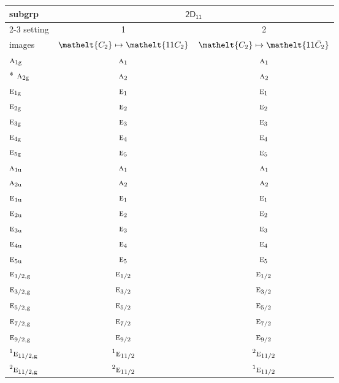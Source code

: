 \documentclass[10pt,a4paper]{article}
\numberwithin{equation}{section}
\newcommand{\eltfont}[1]{{\let\sigma\eltsigma\mathelt{#1}}}
\newcommand{\grp}[1]{\mathsf{#1}}
\newcommand{\irr}[1]{\text{\normalfont\scshape #1}}
\newcommand{\conjpair}[1]{{}^{#1}}
\newcommand{\cls}[1]{\eltfont{#1}}
\newcommand{\ptag}[1]{\mathrm{#1}}
\newcommand{\barred}[1]{\bar{#1}}
\begin{document}
{\small\begin{longtable}{@{}lcc@{}}\toprule
subgrp & \multicolumn{2}{c}{\href{2D11.pdf}{$\grp{2D_{11}}$}}\\\cmidrule(lr){2-3}
setting & 1 & 2\\
images & {\scriptsize $\cls{C_{2}} \mapsto \cls{11C_{2}}$} & {\scriptsize $\cls{C_{2}} \mapsto \cls{11\barred{C}_{2}}$}\\\midrule\endhead
\bottomrule\endfoot\endlastfoot
$\irr{a}_{1\ptag{g}}$ & $\irr{a}_{1}$ & $\irr{a}_{1}$\\*
$\irr{a}_{2\ptag{g}}$ & $\irr{a}_{2}$ & $\irr{a}_{2}$\\
$\irr{e}_{1\ptag{g}}$ & $\irr{e}_{1}$ & $\irr{e}_{1}$\\
$\irr{e}_{2\ptag{g}}$ & $\irr{e}_{2}$ & $\irr{e}_{2}$\\
$\irr{e}_{3\ptag{g}}$ & $\irr{e}_{3}$ & $\irr{e}_{3}$\\
$\irr{e}_{4\ptag{g}}$ & $\irr{e}_{4}$ & $\irr{e}_{4}$\\
$\irr{e}_{5\ptag{g}}$ & $\irr{e}_{5}$ & $\irr{e}_{5}$\\
$\irr{a}_{1\ptag{u}}$ & $\irr{a}_{1}$ & $\irr{a}_{1}$\\
$\irr{a}_{2\ptag{u}}$ & $\irr{a}_{2}$ & $\irr{a}_{2}$\\
$\irr{e}_{1\ptag{u}}$ & $\irr{e}_{1}$ & $\irr{e}_{1}$\\
$\irr{e}_{2\ptag{u}}$ & $\irr{e}_{2}$ & $\irr{e}_{2}$\\
$\irr{e}_{3\ptag{u}}$ & $\irr{e}_{3}$ & $\irr{e}_{3}$\\
$\irr{e}_{4\ptag{u}}$ & $\irr{e}_{4}$ & $\irr{e}_{4}$\\
$\irr{e}_{5\ptag{u}}$ & $\irr{e}_{5}$ & $\irr{e}_{5}$\\
$\irr{e}_{1/2,\ptag{g}}$ & $\irr{e}_{1/2}$ & $\irr{e}_{1/2}$\\
$\irr{e}_{3/2,\ptag{g}}$ & $\irr{e}_{3/2}$ & $\irr{e}_{3/2}$\\
$\irr{e}_{5/2,\ptag{g}}$ & $\irr{e}_{5/2}$ & $\irr{e}_{5/2}$\\
$\irr{e}_{7/2,\ptag{g}}$ & $\irr{e}_{7/2}$ & $\irr{e}_{7/2}$\\
$\irr{e}_{9/2,\ptag{g}}$ & $\irr{e}_{9/2}$ & $\irr{e}_{9/2}$\\
$\conjpair{1}\irr{e}_{11/2,\ptag{g}}$ & $\conjpair{1}\irr{e}_{11/2}$ & $\conjpair{2}\irr{e}_{11/2}$\\
$\conjpair{2}\irr{e}_{11/2,\ptag{g}}$ & $\conjpair{2}\irr{e}_{11/2}$ & $\conjpair{1}\irr{e}_{11/2}$\\

\end{longtable}}
\end{document}
